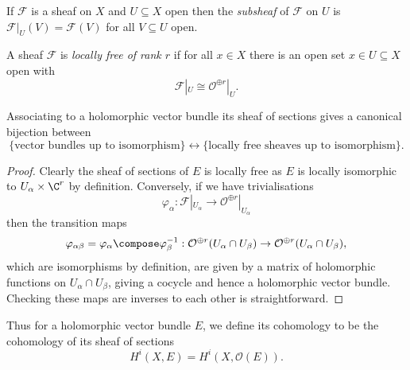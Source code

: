 \documentclass[a4paper]{article}
\begin{document}
\begin{definition}[subsheaf]
  If \(\mathcal F\) is a sheaf on \(X\) and \(U \subseteq X\) open then the \emph{subsheaf} of \(\mathcal F\) on \(U\) is \(\mathcal F|_U(V) = \mathcal F(V)\) for all \(V \subseteq U\) open.
\end{definition}

\begin{definition}
  A sheaf \(\mathcal F\) is \emph{locally free of rank \(r\)} if for all \(x \in X\) there is an open set \(x \in U \subseteq X\) open with
  \[
    \mathcal F|_U \cong \mathcal O^{\oplus r}|_U.
  \]
\end{definition}

\begin{proposition}
  Associating to a holomorphic vector bundle its sheaf of sections gives a canonical bijection between
\[
  \{\text{vector bundles up to isomorphism}\} \leftrightarrow \{\text{locally free sheaves up to isomorphism}\}.
\]
\end{proposition}

\begin{proof}
  Clearly the sheaf of sections of \(E\) is locally free as \(E\) is locally isomorphic to \(U_\alpha \times \C^r\) by definition. Conversely, if we have trivialisations
  \[
    \varphi_\alpha: \mathcal F|_{U_\alpha} \to \mathcal O^{\oplus r}|_{U_\alpha}
  \]
  then the transition maps
  \[
    \varphi_{\alpha\beta} = \varphi_\alpha \compose \varphi_\beta^{-1}: \mathcal O^{\oplus r} (U_\alpha \cap U_\beta) \to \mathcal O^{\oplus r} (U_\alpha \cap U_\beta),
  \]
  which are isomorphisms by definition, are given by a matrix of holomorphic functions on \(U_\alpha \cap U_\beta\), giving a cocycle and hence a holomorphic vector bundle. Checking these maps are inverses to each other is straightforward.
\end{proof}

Thus for a holomorphic vector bundle \(E\), we define its cohomology to be the cohomology of its sheaf of sections
\[
  H^i(X, E) = H^i(X, \mathcal O(E)).
\]
\end{document}
